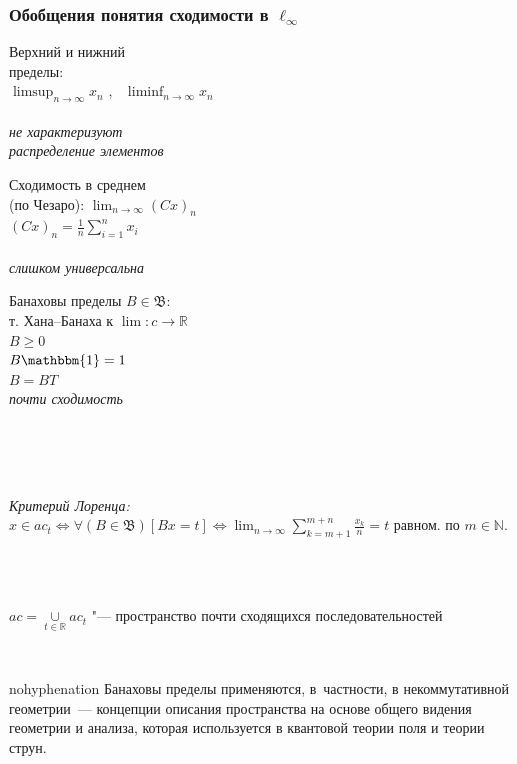 \documentclass[10pt,pdf,hyperref={unicode},aspectratio=169,color={usenames, dvipsnames}]{beamer}
\theoremstyle{definition}
\begin{document}
\begin{frame}
	\frametitle{Обобщения понятия сходимости в $\ell_\infty$}
	\begin{varwidth}[t]{\linewidth}
		\centering
		Верхний и нижний
		\\
		пределы:
		\\
		$\displaystyle \limsup_{n\to\infty} x_n$
		,~
		$\displaystyle \liminf_{n\to\infty} x_n$
		\\~\\
		\emph{
			не характеризуют
			\\
			распределение элементов
		}
	\end{varwidth}
	\hfill
	\begin{varwidth}[t]{\linewidth}
		\centering
		Сходимость в среднем
		\\
		(по Чезаро):
		$\displaystyle \lim_{n\to\infty} (Cx)_n$
		\\
		$\displaystyle (Cx)_n = \frac1n\sum_{i=1}^n x_i$
		\\~\\
		\emph{слишком универсальна}
	\end{varwidth}
	\hfill
	\begin{varwidth}[t]{\linewidth}
		\centering
		Банаховы пределы $B\in \mathfrak{B}$:
		\\
		т. Хана--Банаха к $\lim: c\to\mathbb R$
		\\
			$B \geqslant 0$
		\\
			$B\mathbbm{1} = 1$
		\\
			$B=BT$
		\\
		\emph{почти сходимость}
	\end{varwidth}
	\\~\\~\\
	\begin{varwidth}[t]{\linewidth}
		\centering
		\emph{Критерий Лоренца:}
		$\displaystyle
			x\in ac_t
			\Leftrightarrow
			\forall(B\in\mathfrak{B})[Bx = t]
			\Leftrightarrow
			\lim_{n\to\infty}  \sum_{k=m+1}^{m+n} \frac{x_k}n = t
		$
		равном. по $m\in\mathbb{N}$.
	\end{varwidth}
	\\~\\
	\vspace{0.8em}
	\begin{varwidth}[t]{\linewidth}
		$\displaystyle ac = \mathop{\cup}\limits_{t\in\mathbb R} ac_t$ "--- пространство почти сходящихся последовательностей
	\end{varwidth}
	\\
	\vspace{0.8em}
	\begin{varwidth}[t]{0.52\linewidth}\begin{hyphenrules}{nohyphenation}
		Банаховы пределы применяются, в~частности,
		в некоммутативной геометрии~---
		концепции описания
		пространства на основе общего видения
		геометрии и анализа,
		которая используется в квантовой теории поля и теории струн.
	\end{hyphenrules}\end{varwidth}
\end{frame}
\end{document}
